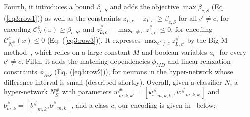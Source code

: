 Fourth, it introduces a bound $\beta_{c,S}$ and adds the objective $\max \beta_{c,S}$ (Eq. (\ref{eq3:row1})) as well as the constraints $z_{L,c} -  z_{L,c'} \geq \beta_{c,S}$ for all $c'\neq c$, 
for encoding $\mathcal{C}_{N}^c(x) \geq \beta_{c,S}$,
and 
$z^\#_{L,c} - \max_{c'\neq c} z^\#_{L,c'} \leq 0$, for encoding $\mathcal{C}_{{N}_{S}^\#}^{c}(x) \leq 0$ (Eq. (\ref{eq3:row3})). 
It expresses $\max_{c'\neq c} z^\#_{L,c'}$ by the Big M method~\cite{ref_73}, which relies on a large constant $M$ and boolean variables $a_{c'}$ for every $c'\neq c$. 
Fifth, it adds the matching dependencies $\phi_{MD}$ and linear relaxation constraints $\phi_{RiS}$ (Eq. (\ref{eq3:row2})), for neurons in the hyper-network whose difference interval is small (described shortly). %
Overall, given a classifier $N$, a hyper-network $N^\#_S$ with parameters $w_{m,k,k'}^\#=[\underline{w^\#}_{m,k,k'},\overline{w^\#}_{m,k,k'}]$ and $b_{m,k}^\#=[\underline{b^\#}_{m,k},\overline{b^\#}_{m,k}]$, and a class $c$, our encoding is given in~ below:
%

